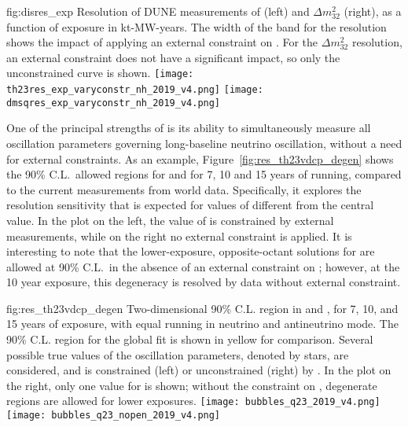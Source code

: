\begin{dunefigure}
{fig:disres_exp}
{Resolution of DUNE measurements of  (left) and $\Delta m^{2}_{32}$ (right), as a function of exposure in kt-MW-years. The width of the band for the  resolution shows the impact of applying an external constraint on . For the $\Delta m^{2}_{32}$ resolution, an external constraint does not have a significant impact, so only the unconstrained curve is shown.}
		\texttt{[image: th23res\_exp\_varyconstr\_nh\_2019\_v4.png]} %
		\texttt{[image: dmsqres\_exp\_varyconstr\_nh\_2019\_v4.png]} 
\end{dunefigure}



One of the principal strengths of  is its ability to simultaneously measure all oscillation parameters governing long-baseline neutrino oscillation, without a need for external constraints. As an example, Figure~\ref{fig:res_th23vdcp_degen} shows the 90\% C.L.\ allowed regions for  and \deltacp for 7, 10 and 15 years of running, 
compared to the current measurements from world data.
Specifically, it explores the resolution sensitivity that is expected 
for values of  different from the  central value.  In the plot on the 
left, the value of  is constrained by external measurements, while on the right no external constraint is applied.
It is interesting to note that the lower-exposure, opposite-octant solutions for  are allowed at 90\% C.L.\ in the absence of an external constraint on ; however, at the 10 year exposure, this degeneracy is resolved by  data without external constraint.


\begin{dunefigure}
{fig:res_th23vdcp_degen}
{Two-dimensional 90\% C.L. region in  and \deltacp, for 7, 10, and 15 years of exposure, with equal running in neutrino and antineutrino mode. The 90\% C.L. region for the  global fit is shown in yellow for comparison. Several possible true values of the oscillation parameters, denoted by stars, are considered, and  is constrained (left) or unconstrained (right) by . In the plot on the right, only one value for  is shown; without the constraint on , degenerate regions are allowed for lower exposures.}
		\texttt{[image: bubbles\_q23\_2019\_v4.png]} %
		\texttt{[image: bubbles\_q23\_nopen\_2019\_v4.png]} 
\end{dunefigure}



